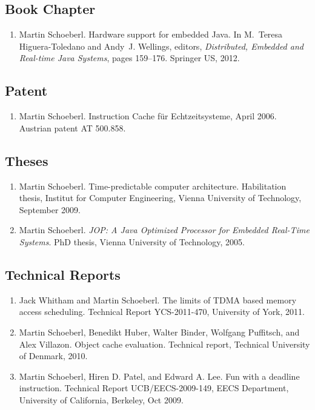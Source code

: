 \documentclass[%
    a4paper,
    11pt, %
    headinclude, footexclude,
    notitlepage,
    headsepline,
    pointlessnumbers,
    ]{scrartcl}
\begin{document}
\subsection*{Book Chapter}

\begin{enumerate}

\item Martin Schoeberl.
 Hardware support for embedded {Java}.
 In M.~Teresa Higuera-Toledano and Andy~J. Wellings, editors, {\em
  Distributed, Embedded and Real-time {Java} Systems}, pages 159--176. Springer
  US, 2012.
\end{enumerate}

\subsection*{Patent}

\begin{enumerate}

\item Martin Schoeberl. Instruction Cache f\"ur Echtzeitsysteme,
    April 2006. Austrian patent AT 500.858.
\end{enumerate}


\subsection*{Theses}

\begin{enumerate}

\item Martin Schoeberl.
 Time-predictable computer architecture.
 Habilitation thesis, Institut for Computer Engineering, Vienna
  University of Technology, September 2009.

\item Martin Schoeberl. {\em JOP: A Java Optimized Processor for
    Embedded Real-Time Systems}. PhD thesis, Vienna University of
    Technology, 2005.
\end{enumerate}



  
\subsection*{Technical Reports}

\begin{enumerate}

\item Jack Whitham and Martin Schoeberl.
 The limits of TDMA based memory access scheduling.
 Technical Report YCS-2011-470, University of York, 2011.

\item Martin Schoeberl, Benedikt Huber, Walter Binder, Wolfgang Puffitsch, and Alex
  Villazon.
 Object cache evaluation.
 Technical report, Technical University of Denmark, 2010.

\item Martin Schoeberl, Hiren D. Patel, and Edward A. Lee. Fun
    with a deadline instruction. Technical Report
UCB/EECS-2009-149, EECS Department, University of
  California, Berkeley, Oct 2009.
 

\end{enumerate}
\end{document}
